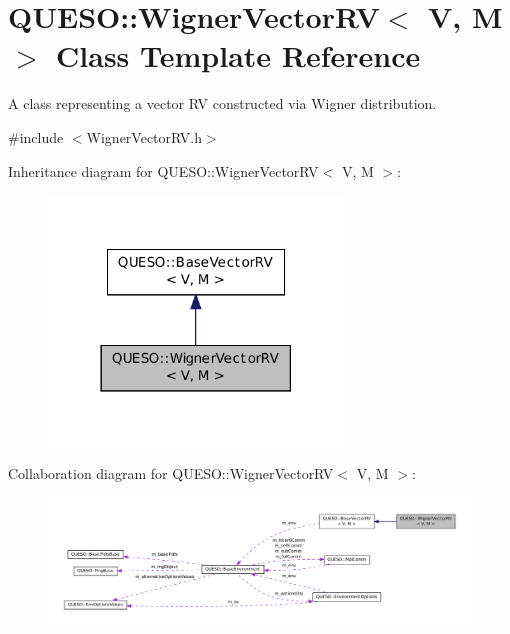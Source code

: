 \hypertarget{class_q_u_e_s_o_1_1_wigner_vector_r_v}{\section{Q\-U\-E\-S\-O\-:\-:Wigner\-Vector\-R\-V$<$ V, M $>$ Class Template Reference}
\label{class_q_u_e_s_o_1_1_wigner_vector_r_v}
}


A class representing a vector R\-V constructed via Wigner distribution.  




{\ttfamily \#include $<$Wigner\-Vector\-R\-V.\-h$>$}



Inheritance diagram for Q\-U\-E\-S\-O\-:\-:Wigner\-Vector\-R\-V$<$ V, M $>$\-:
\nopagebreak
\begin{figure}[H]
\begin{center}
\leavevmode
\includegraphics[width=222pt]{class_q_u_e_s_o_1_1_wigner_vector_r_v__inherit__graph}
\end{center}
\end{figure}


Collaboration diagram for Q\-U\-E\-S\-O\-:\-:Wigner\-Vector\-R\-V$<$ V, M $>$\-:
\nopagebreak
\begin{figure}[H]
\begin{center}
\leavevmode
\includegraphics[width=350pt]{class_q_u_e_s_o_1_1_wigner_vector_r_v__coll__graph}
\end{center}
\end{figure}
